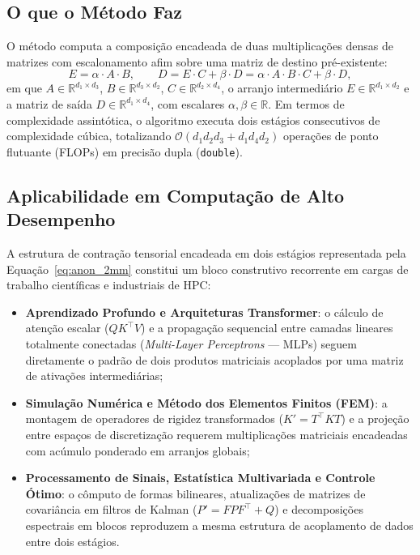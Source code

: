 \subsection{O que o Método Faz}
\label{subsec:anon_o_que_faz}

O método computa a composição encadeada de duas multiplicações densas de matrizes com escalonamento afim sobre uma matriz de destino pré-existente:
\begin{equation}
    E = \alpha \cdot A \cdot B, \qquad D = E \cdot C + \beta \cdot D = \alpha \cdot A \cdot B \cdot C + \beta \cdot D,
    \label{eq:anon_2mm}
\end{equation}
em que $A \in \mathbb{R}^{d_1 \times d_3}$, $B \in \mathbb{R}^{d_3 \times d_2}$, $C \in \mathbb{R}^{d_2 \times d_4}$, o arranjo intermediário $E \in \mathbb{R}^{d_1 \times d_2}$ e a matriz de saída $D \in \mathbb{R}^{d_1 \times d_4}$, com escalares $\alpha, \beta \in \mathbb{R}$. Em termos de complexidade assintótica, o algoritmo executa dois estágios consecutivos de complexidade cúbica, totalizando $\mathcal{O}(d_1 d_2 d_3 + d_1 d_4 d_2)$ operações de ponto flutuante (FLOPs) em precisão dupla (\texttt{double}).

\subsection{Aplicabilidade em Computação de Alto Desempenho}
\label{subsec:anon_aplicabilidade}

A estrutura de contração tensorial encadeada em dois estágios representada pela Equação~\eqref{eq:anon_2mm} constitui um bloco construtivo recorrente em cargas de trabalho científicas e industriais de HPC:
\begin{itemize}
    \item \textbf{Aprendizado Profundo e Arquiteturas Transformer}: o cálculo de atenção escalar ($Q K^\top V$) e a propagação sequencial entre camadas lineares totalmente conectadas (\textit{Multi-Layer Perceptrons} --- MLPs) seguem diretamente o padrão de dois produtos matriciais acoplados por uma matriz de ativações intermediárias;
    \item \textbf{Simulação Numérica e Método dos Elementos Finitos (FEM)}: a montagem de operadores de rigidez transformados ($K' = T^\top K T$) e a projeção entre espaços de discretização requerem multiplicações matriciais encadeadas com acúmulo ponderado em arranjos globais;
    \item \textbf{Processamento de Sinais, Estatística Multivariada e Controle Ótimo}: o cômputo de formas bilineares, atualizações de matrizes de covariância em filtros de Kalman ($P' = F P F^\top + Q$) e decomposições espectrais em blocos reproduzem a mesma estrutura de acoplamento de dados entre dois estágios.
\end{itemize}


